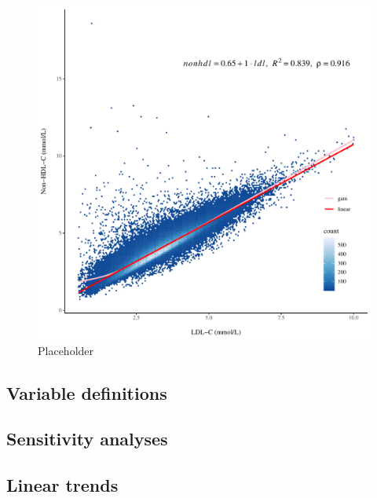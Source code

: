 \documentclass[12pt]{article}
\begin{document}
\begin{appendix}
    \begin{figure}[H]
    \centering
    \includegraphics[width=\textwidth]{../3_figures/figS1_calibration.pdf}
    \caption{Placeholder}
    \label{fig:placeholder}
    \end{figure}
    
    \subsection{Variable definitions}
    
    \subsection{Sensitivity analyses}

    \subsection{Linear trends}


\end{appendix}
\end{document}
